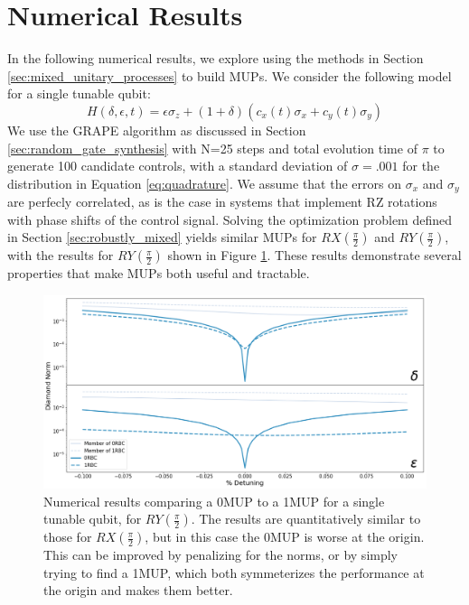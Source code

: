 \documentclass[aps,nofootinbib,pra,notitlepage,twocolumn]{revtex4-1}
\begin{document}
\section{Numerical Results}
\label{sec:numerical_results}
In the following numerical results, we explore using the methods in Section \ref{sec:mixed_unitary_processes} to build MUPs. We consider the following model for a single tunable qubit: 
\begin{equation}\label{eq:1Qham}
  H(\delta, \epsilon, t) = \epsilon\sigma_z + (1 + \delta)(c_x(t)\sigma_x + c_y(t)\sigma_y)
\end{equation}
We use the GRAPE algorithm as discussed in Section  \ref{sec:random_gate_synthesis} with N=25 steps and total evolution time of $\pi$ to generate 100 candidate controls, with a standard deviation of $\sigma=.001$ for the distribution in Equation \ref{eq:quadrature}. We assume that the errors on $\sigma_x$ and $\sigma_y$ are perfecly correlated, as is the case in systems that implement RZ rotations with phase shifts of the control signal. Solving the optimization problem defined in Section \ref{sec:robustly_mixed} yields similar MUPs for $RX(\frac{\pi}{2})$ and $RY(\frac{\pi}{2})$, with the results for $RY(\frac{\pi}{2})$ shown in Figure \ref{fig:YMUP}. These results demonstrate several properties that make MUPs both useful and tractable.

\begin{figure}
  \centering
  \includegraphics[width=\textwidth]{SQRTY.png}
  \caption{Numerical results comparing a 0MUP to a 1MUP for a single tunable qubit, for $RY(\frac{\pi}{2})$. The results are quantitatively similar to those for $RX(\frac{\pi}{2})$, but in this case the 0MUP is worse at the origin. This can be improved by penalizing for the norms, or by simply trying to find a 1MUP, which both symmeterizes the performance at the origin and makes them better.}
  \label{fig:YMUP}
\end{figure}
\end{document}

